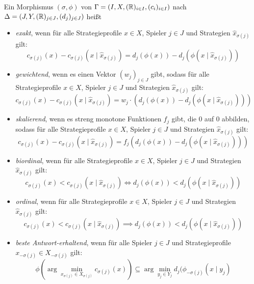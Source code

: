 \begin{defn}
	Ein Morphismus $(\sigma, \phi)$ von $\Gamma = (I, X, (\mathbb{R})_{i\in I}, (c_i)_{i\in I})$ nach $\Delta = (J, Y, (\mathbb{R})_{j\in J}, (d_j)_{j\in J})$ heißt
	\begin{itemize}
		\item \emph{exakt}, wenn für alle Strategieprofile $x \in X$, Spieler $j \in J$ und Strategien $\hat{x}_{\sigma(j)}$ gilt:
		\[c_{\sigma(j)}(x) - c_{\sigma(j)}(x \mid \hat{x}_{\sigma(j)}) = d_j(\phi(x)) - d_j(\phi(x \mid \hat{x}_{\sigma(j)}))\]
		\item \emph{gewichtend}, wenn es einen Vektor $(w_j)_{j \in J}$ gibt, sodass für alle Strategieprofile $x \in X$, Spieler $j \in J$ und Strategien $\hat{x}_{\sigma(j)}$ gilt:
		\[c_{\sigma(j)}(x) - c_{\sigma(j)}(x \mid \hat{x}_{\sigma(j)}) = w_j\cdot\left(d_j(\phi(x)) - d_j(\phi(x \mid \hat{x}_{\sigma(j)}))\right)\]
		\item \emph{skalierend}, wenn es streng monotone Funktionen $f_j$ gibt, die $0$ auf $0$ abbilden, sodass für alle Strategieprofile $x \in X$, Spieler $j \in J$ und Strategien $\hat{x}_{\sigma(j)}$ gilt:
		\[c_{\sigma(j)}(x) - c_{\sigma(j)}(x \mid \hat{x}_{\sigma(j)}) = f_j(d_j(\phi(x)) - d_j(\phi(x \mid \hat{x}_{\sigma(j)})))\]
		\item \emph{biordinal}, wenn für alle Strategieprofile $x \in X$, Spieler $j \in J$ und Strategien $\hat{x}_{\sigma(j)}$ gilt:
		\[c_{\sigma(j)}(x) < c_{\sigma(j)}(x \mid \hat{x}_{\sigma(j)}) \iff d_j(\phi(x)) < d_j(\phi(x \mid \hat{x}_{\sigma(j)}))\]
		\item \emph{ordinal}, wenn für alle Strategieprofile $x \in X$, Spieler $j \in J$ und Strategien $\hat{x}_{\sigma(j)}$ gilt:
		\[c_{\sigma(j)}(x) < c_{\sigma(j)}(x \mid \hat{x}_{\sigma(j)}) \implies d_j(\phi(x)) < d_j(\phi(x \mid \hat{x}_{\sigma(j)}))\]
		\item \emph{beste Antwort-erhaltend}, wenn für alle Spieler $j \in J$ und Strategieprofile $x_{-\sigma(j)} \in X_{-\sigma(j)}$ gilt:
		\[\phi(\arg \min_{x_{\sigma(j)} \in X_{\sigma(j)}}c_{\sigma(j)}(x)) \subseteq \arg \min_{y_j \in Y_j} d_j(\phi_{-\sigma(j)}(x \mid y_j)\]
	\end{itemize}	
\end{defn}
